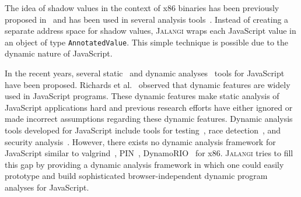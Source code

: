\documentclass{sig-alternate}
\def\jalangi{\textsc{Jalangi}}
\begin{document}
The idea of shadow values in the context of x86 binaries has been
previously proposed
in~\cite{Nethercote:2007:VFH:1250734.1250746,Zhao:2010:1772954.1772960}
and has been used in several analysis
tools~\cite{Zhao:2010:1772954.1772960,songndss05,Bond:2007:TBA:1297027.1297057,hobbs}.
Instead of creating a separate address space for shadow values,
\jalangi{} wraps each JavaScript value in an object of type
\texttt{AnnotatedValue}.  This simple technique is possible due to the
dynamic nature of JavaScript.

In the recent years, several
static~\cite{Yu:2007:JIB:1190216.1190252,Jensen:2010:IAL:1882094.1882114,Anderson:2005:TTI:2144892.2144917,manuicse13,Wei:2012:BAJ:2384716.2384758,Sridharan:2012:CTP:2367163.2367191}
and dynamic
analyses~\cite{Petrov:2012:RDW:2254064.2254095,Richards:2010:ADB:1806596.1806598,Artzi:2011:FAT:1985793.1985871,Mesbah:2009:IAT:1555001.1555037}
tools for JavaScript have been proposed.  Richards et
al.~\cite{Richards:2010:ADB:1806596.1806598} observed that dynamic
features are widely used in JavaScript programs.  These dynamic
features make static analysis of JavaScript applications hard and
previous research efforts have either ignored or made incorrect
assumptions regarding these dynamic features.  Dynamic analysis tools
developed for JavaScript include tools for
testing~\cite{Artzi:2011:FAT:1985793.1985871,Saxena:2010:SEF:1849417.1849985},
race detection~\cite{Petrov:2012:RDW:2254064.2254095}, and security
analysis~\cite{Vikram:2009:RAS:1653662.1653685}.  However, there
exists no dynamic analysis framework for JavaScript similar to
valgrind~\cite{Nethercote:2007:VFH:1250734.1250746},
PIN~\cite{Luk:2005:PBC:1065010.1065034},
DynamoRIO~\cite{Bruening:2003:IAD:776261.776290} for x86.  \jalangi{}
tries to fill this gap by providing a dynamic analysis framework in
which one could easily prototype and build sophisticated
browser-independent dynamic program analyses for JavaScript.

{\small


}
\end{document}
